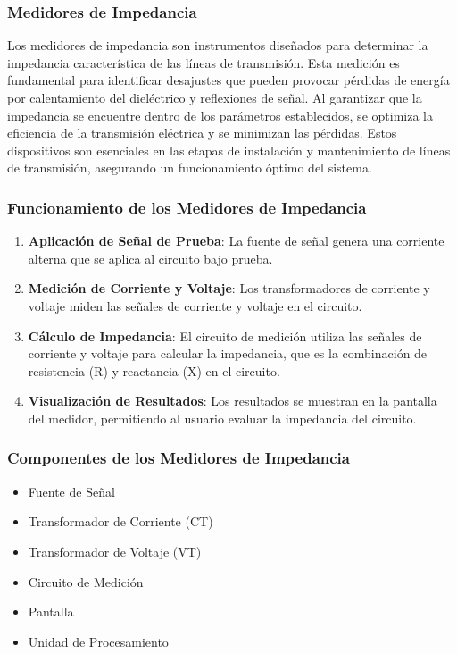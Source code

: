         \subsubsection{Medidores de Impedancia}

            Los medidores de impedancia son instrumentos diseñados para determinar la impedancia característica de las líneas de transmisión. Esta medición es fundamental para identificar desajustes que pueden provocar pérdidas de energía por calentamiento del dieléctrico y reflexiones de señal. Al garantizar que la impedancia se encuentre dentro de los parámetros establecidos, se optimiza la eficiencia de la transmisión eléctrica y se minimizan las pérdidas. Estos dispositivos son esenciales en las etapas de instalación y mantenimiento de líneas de transmisión, asegurando un funcionamiento óptimo del sistema.
            
        \subsubsection*{Funcionamiento de los Medidores de Impedancia}

            \begin{enumerate}
                \item \textbf{Aplicación de Señal de Prueba}: La fuente de señal genera una corriente alterna que se aplica al circuito bajo prueba.
                \item \textbf{Medición de Corriente y Voltaje}: Los transformadores de corriente y voltaje miden las señales de corriente y voltaje en el circuito.
                \item \textbf{Cálculo de Impedancia}: El circuito de medición utiliza las señales de corriente y voltaje para calcular la impedancia, que es la combinación de resistencia (R) y reactancia (X) en el circuito.
                \item \textbf{Visualización de Resultados}: Los resultados se muestran en la pantalla del medidor, permitiendo al usuario evaluar la impedancia del circuito.
            \end{enumerate}

        \subsubsection*{Componentes de los Medidores de Impedancia}

            \begin{itemize}
              \item Fuente de Señal
              \item Transformador de Corriente (CT)
              \item Transformador de Voltaje (VT)
              \item Circuito de Medición
              \item Pantalla
              \item Unidad de Procesamiento
            \end{itemize}

